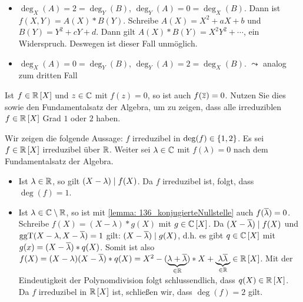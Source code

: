\begin{exercisePage}
\begin{solution}
\begin{enumerate}[leftmargin=*, label=(\alph*)]
\begin{enumerate}[label=(\roman*)]
\begin{itemize}[leftmargin=*]
                    \item $\deg_X(A) = 2 = \deg_Y(B)$, $\deg_Y(A) = 0 = \deg_X(B)$. Dann ist $f(X,Y) = A(X) * B(Y)$. Schreibe $A(X) = X^2 + aX + b$ und $B(Y) = Y^2 + cY + d$. Dann gilt $A(X)*B(Y) = X^2 Y^2 + \cdots$, ein Widerspruch. Deswegen ist dieser Fall unmöglich.
                    \item $\deg_X(A) = 0 = \deg_Y(B)$, $\deg_Y(A) = 2 = \deg_X(B)$. $\leadsto$ analog zum dritten Fall
                \end{itemize}
            \end{enumerate}
        \end{enumerate}
    \end{solution}

    \begin{exercise}
        Ist $f \in \mathbb{R} \left[ X \right]$ und $z \in \mathbb{C}$ mit $f(z) = 0$, so ist auch $f(\overline{z}) = 0$. Nutzen Sie dies sowie den Fundamentalsatz der Algebra, um zu zeigen, dass alle irreduziblen $f \in \mathbb{R} \left[ X \right]$ Grad $1$ oder $2$ haben.
    \end{exercise}
    \begin{solution}
        Wir zeigen die folgende Aussage: $f$ irreduzibel in \equivalent $\deg(f) \in \left\{ 1,2 \right\}$.
        Es sei $f \in \mathbb{R} \left[ X \right]$ irreduzibel über $\mathbb{R}$. Weiter sei $\lambda \in \mathbb{C}$ mit $f(\lambda) = 0$ nach dem Fundamentalsatz der Algebra. 
        \begin{itemize}
            \item Ist $\lambda \in \mathbb{R}$, so gilt $(X - \lambda) \mathrel{\mid} f(X)$. Da $f$ irreduzibel ist, folgt, dass $\deg(f) = 1$.
            \item Ist $\lambda \in \mathbb{C} \setminus \mathbb{R}$, so ist mit \cref{lemma: 136_konjugierteNullstelle} auch $f(\overline{\lambda}) = 0$. Schreibe $f(X) = (X - \lambda) * g(X)$ mit $g \in \mathbb{C} \left[ X \right]$. Da $(X - \overline{\lambda}) \mathrel{\mid} f(X)$ und $\operatorname{ggT}(X - \lambda , X - \overline{\lambda}) = 1$ gilt: $(X - \overline{\lambda}) \mathrel{\mid} g(X)$, d.h. es gibt $q \in \mathbb{C} \left[ X \right]$ mit $g(x) = (X - \overline{\lambda}) * q(X)$. Somit ist also $f(X) = (X - \lambda) (X - \overline{\lambda}) * q(X) = X^2 - (\underbrace{\lambda + \overline{\lambda}}_{\in \mathbb{R}}) * X + \underbrace{\lambda \overline{\lambda}}_{\in \mathbb{R}} \in \mathbb{R} \left[ X \right]$. Mit der Eindeutigkeit der Polynomdivision folgt schlussendlich, dass $q(X) \in \mathbb{R} \left[ X \right]$. Da $f$ irreduzibel in $\mathbb{R} \left[ X \right]$
            ist, schließen wir, dass $\deg(f) = 2$ gilt.
        \end{itemize}
    \end{solution}
    \setcounter{taskcount}{144}


\end{exercisePage}
